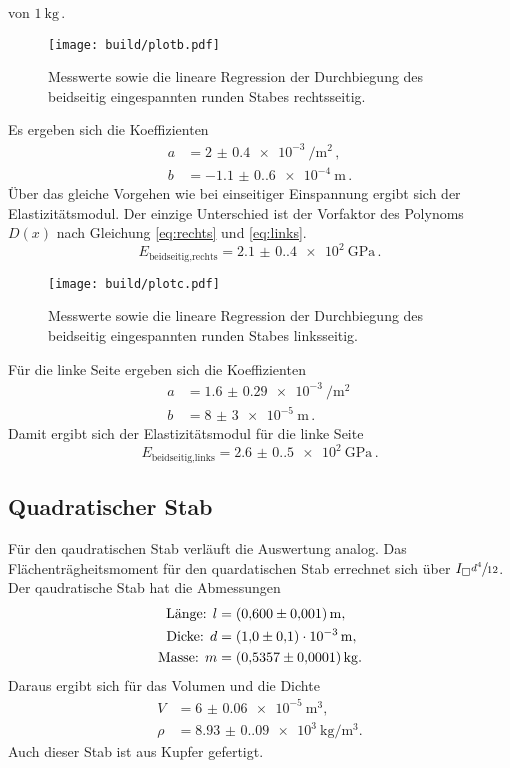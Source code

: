 von $\qty{1}{\kilo\gram}$\,. 
\begin{figure}[H]
    \centering
    \label{fig:plotb}
    \caption{Messwerte sowie die lineare Regression der Durchbiegung des beidseitig eingespannten runden Stabes rechtsseitig.}
    \texttt{[image: build/plotb.pdf]}
\end{figure}
Es ergeben sich die Koeffizienten 
\begin{align*}
    a&=\qty{2(0.4)e-3}{\per\meter\squared}\,,\\
    b&=\qty{-1.1(0.6)e-4}{\meter}\,.
\end{align*}
Über das gleiche Vorgehen wie bei einseitiger Einspannung ergibt sich der Elastizitätsmodul. Der einzige Unterschied ist 
der Vorfaktor des Polynoms $D(x)$ nach Gleichung \eqref{eq:rechts} und \eqref{eq:links}.
\begin{equation*}
E_\text{beidseitig,rechts}=\qty{2.1(0.4)e2}{\giga\pascal}\,.
\end{equation*}
\begin{figure}[H]
    \centering
    \label{fig:plotc}
    \caption{Messwerte sowie die lineare Regression der Durchbiegung des beidseitig eingespannten runden Stabes linksseitig.}
    \texttt{[image: build/plotc.pdf]}
\end{figure}
Für die linke Seite ergeben sich die Koeffizienten
\begin{align*}
    a&=\qty{1,6(0.29)e-3}{\per\meter\squared}\,\\
    b&=\qty{8(3)e-5}{\meter}\,.
\end{align*}
Damit ergibt sich der Elastizitätsmodul für die linke Seite
\begin{equation*}
    E_{\text{beidseitig,links}}=\qty{2.6(0.5)e2}{\giga\pascal}\,.
\end{equation*}
\subsection{Quadratischer Stab}
Für den qaudratischen Stab verläuft die Auswertung analog. Das Flächenträgheitsmoment für den quardatischen Stab errechnet sich
über $I_\square\sfrac{d^4}{12}$. Der qaudratische Stab hat die Abmessungen 
\begin{align*}
    \text{Länge: } l&=\qty{0,6(0.001)}{\meter},\\
    \text{Dicke: } d&=\qty{1,0(0,1)e-3}{\meter},\\
    \text{Masse: } m&=\qty{0,5357(0.0001)}{\kilo\gram}.
\end{align*}
Daraus ergibt sich für das Volumen und die Dichte 
\begin{align*}
    V&=\qty{6(0.06)e-5}{\meter\cubed},\\
    \rho&=\qty{8.93(0.09)e3}{\kilo\gram\per\meter\cubed}.
\end{align*}
Auch dieser Stab ist aus Kupfer gefertigt.
